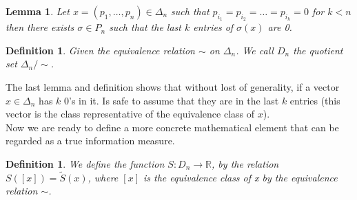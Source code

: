 \documentclass[11pt]{article}
\theoremstyle{plain}
\newtheorem{definition}[theorem]{Definition}
\newtheorem{lemma}[theorem]{Lemma}
\begin{document}
\begin{lemma}
Let $x=(p_{1},\ldots,p_{n}) \in\Delta_{n}$ such that
$p_{i_{1}}=p_{i_{2}}=\ldots=p_{i_{k}}=0$ for $k<n$ then there
exists  $\sigma\in P_{n}$ such that the last $k$ entries of
$\sigma(x)$ are 0.
\end{lemma}



\begin{definition}\label{def:D}
Given the equivalence relation $\sim$ on $\Delta_{n}$. We call $D_{n}$ the
quotient set $\Delta_{n}/\sim$.
\end{definition}


The last lemma and definition shows that without lost of
generality, if a vector  $x\in \Delta_{n}$ has $k$ 0's in it. Is safe
to assume that they are in the last $k$ entries (this vector is the
class representative of the equivalence class of $x$).\smallskip
\\
Now we are ready to define a more concrete mathematical element that can be regarded as a true information measure.

\begin{definition}
We define the function  $S:D_{n}\rightarrow\mathbb{R}$, by the relation
$S([x])=\tilde{S}(x)$, where $[x]$ is the equivalence class of x
by the equivalence relation $\sim$.
\end{definition}
\end{document}
